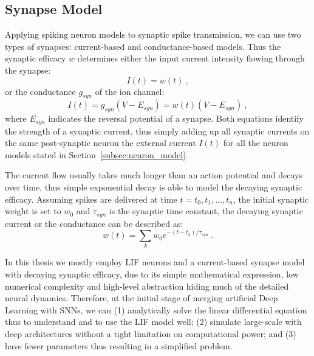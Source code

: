 \subsection{Synapse Model}
Applying spiking neuron models to synaptic spike transmission, we can use two types of synapses: current-based and conductance-based models.
Thus the synaptic efficacy $w$ determines either the input current intensity flowing through the synapse: \begin{equation}
I(t) = w(t)~,
\end{equation}
or the \protect{} \protect{} conductance $g_{syn}$ of the ion channel: \begin{equation}
I(t) = g_{syn} (V-E_{syn}) = w(t) (V-E_{syn})~,
\end{equation}
where $E_{syn}$ indicates the reversal potential of a synapse.
Both equations identify the strength of a synaptic current, thus simply adding up all synaptic currents on the same post-synaptic neuron \protect{} \protect{} the external current $I(t)$ for all the neuron models stated in Section~\ref{subsec:neuron_model}.

The current flow usually takes much longer than an action potential and decays over time, thus \protect{} \protect{} simple exponential decay is able to model the decaying synaptic efficacy.
Assuming spikes are delivered at time $t={t_0, t_1, ..., t_n}$, the initial synaptic weight is set to $w_0$ and $\tau_{syn}$ is the synaptic time constant, the decaying synaptic current or the conductance can be described as:
\begin{equation}
w(t) = \sum_k w_0 e^{-(t-t_k)/\tau_{syn}}~.
\end{equation}

In this thesis we mostly employ LIF neurons and a current-based synapse model with decaying synaptic efficacy, due to its simple mathematical expression, low numerical complexity and high-level abstraction hiding much of the detailed neural dynamics.
Therefore, at the initial stage of merging artificial Deep Learning with \protect{} \protect{} SNNs, we can (1) analytically solve the linear differential equation thus to understand and to use the LIF model well; (2) simulate large-scale \protect{} \protect{} with deep architectures without a tight limitation on computational power; and (3) have fewer parameters thus resulting in a simplified problem.


